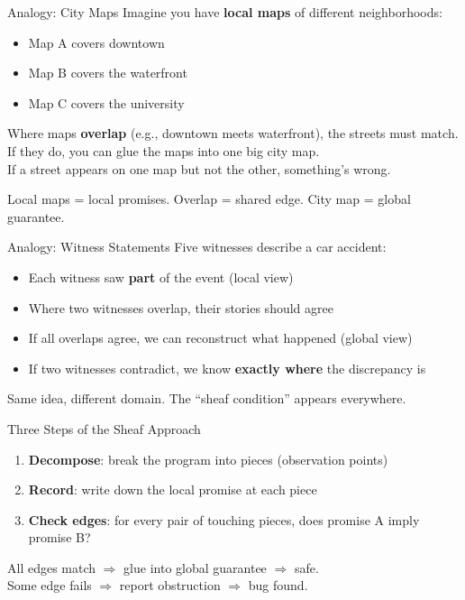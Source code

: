 \documentclass[aspectratio=169,10pt]{beamer}
\newcommand{\hint}[1]{\begin{center}
  \colorbox{hintbg}{\parbox{0.88\textwidth}{\centering\small #1}}\end{center}}
\begin{document}
\begin{frame}{Analogy: City Maps}
Imagine you have \textbf{local maps} of different neighborhoods:
\vspace{0.3em}
\begin{itemize}
  \item Map A covers downtown
  \item Map B covers the waterfront
  \item Map C covers the university
\end{itemize}
\vspace{0.3em}
Where maps \textbf{overlap} (e.g., downtown meets waterfront), the streets must match.\\[0.3em]
If they do, you can glue the maps into one big city map.\\
If a street appears on one map but not the other, something's wrong.
\hint{Local maps = local promises. Overlap = shared edge. City map = global guarantee.}
\end{frame}

\begin{frame}{Analogy: Witness Statements}
Five witnesses describe a car accident:
\vspace{0.3em}
\begin{itemize}
  \item Each witness saw \textbf{part} of the event (local view)
  \item Where two witnesses overlap, their stories should agree
  \item If all overlaps agree, we can reconstruct what happened (global view)
  \item If two witnesses contradict, we know \textbf{exactly where} the discrepancy is
\end{itemize}
\vspace{0.3em}
Same idea, different domain. The ``sheaf condition'' appears everywhere.
\end{frame}

\begin{frame}{Three Steps of the Sheaf Approach}
\begin{enumerate}
  \item \textbf{Decompose}: break the program into pieces (observation points)
  \item \textbf{Record}: write down the local promise at each piece
  \item \textbf{Check edges}: for every pair of touching pieces, does promise A imply promise B?
\end{enumerate}
\vspace{0.5em}
All edges match $\Rightarrow$ glue into global guarantee $\Rightarrow$ \textcolor{safe}{safe}.\\
Some edge fails $\Rightarrow$ report obstruction $\Rightarrow$ \textcolor{danger}{bug found}.
\end{frame}
\end{document}
